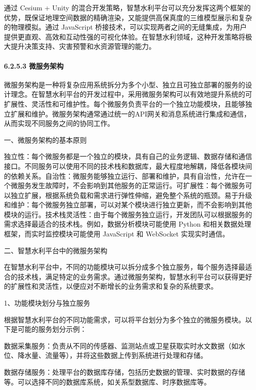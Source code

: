 通过 Cesium + Unity 的混合开发策略，智慧水利平台可以充分发挥这两个框架的优势，既保证地理空间数据的精确渲染，又能提供高保真度的三维模型展示和复杂的物理模拟。通过 JavaScript 桥接技术，可以实现两者之间的无缝集成，为用户提供更直观、高效和互动性强的可视化体验。在智慧水利领域，这种开发策略将极大提升决策支持、灾害预警和水资源管理的能力。

\hypertarget{ux5faeux670dux52a1ux67b6ux6784}{%
\paragraph{6.2.5.3 微服务架构}\label{ux5faeux670dux52a1ux67b6ux6784}}

微服务架构是一种将复杂应用系统拆分为多个小型、独立且可独立部署的服务的设计理念。在智慧水利平台的开发过程中，采用微服务架构可以有效地提升系统的可扩展性、灵活性和可维护性。每个微服务负责平台的一个独立功能模块，且能够独立扩展和维护。微服务架构通常通过统一的API网关和消息系统进行集成和通信，从而实现不同服务之间的协同工作。

一、微服务架构的基本原则

独立性：每个微服务都是一个独立的模块，具有自己的业务逻辑、数据存储和通信接口。不同服务可以使用不同的技术栈和数据库，最大程度地解耦，降低各模块间的依赖关系。自治性：微服务能够独立运行、部署和维护，具有自治性，允许在一个微服务发生故障时，不会影响到其他服务的正常运行。可扩展性：每个微服务可以独立扩展，根据系统负载和需求进行弹性伸缩，避免整个系统的瓶颈。易于升级和维护：每个微服务独立部署，可以对某个模块进行独立更新，而不会影响到其他模块的运行。技术栈灵活性：由于每个微服务独立运行，开发团队可以根据服务的需求选择最适合的技术栈。例如，数据分析模块可能使用 Python 和相关数据处理框架，而实时监控模块可能使用 JavaScript 和 WebSocket 实现实时通信。

二、智慧水利平台中的微服务架构

在智慧水利平台中，不同的功能模块可以拆分成多个独立服务，每个服务选择最适合的技术栈，满足特定的业务需求。通过微服务架构，智慧水利平台可以获得更好的扩展性和灵活性，以便应对不断增长的业务需求和复杂的系统要求。

1、功能模块划分与独立服务

根据智慧水利平台的不同功能需求，可以将平台划分为多个独立的微服务模块。以下是可能的服务划分示例：

数据采集服务：负责从不同的传感器、监测站点或卫星获取实时水文数据（如水位、降水量、流量等），并将这些数据上传到系统进行处理和存储。

数据存储服务：处理平台的数据库存储，包括历史数据的管理、实时数据的存储等。可以选择不同的数据库系统，如关系型数据库、时序数据库等。

